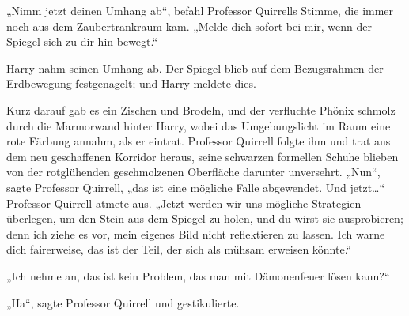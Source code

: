 „Nimm jetzt deinen Umhang ab“, befahl Professor Quirrells Stimme, die immer noch aus dem Zaubertrankraum kam. „Melde dich sofort bei mir, wenn der Spiegel sich zu dir hin bewegt.“

Harry nahm seinen Umhang ab.
Der Spiegel blieb auf dem Bezugsrahmen der Erdbewegung festgenagelt; und Harry meldete dies.

Kurz darauf gab es ein Zischen und Brodeln, und der verfluchte Phönix schmolz durch die Marmorwand hinter Harry, wobei das Umgebungslicht im Raum eine rote Färbung annahm, als er eintrat. Professor Quirrell folgte ihm und trat aus dem neu geschaffenen Korridor heraus, seine schwarzen formellen Schuhe blieben von der rotglühenden geschmolzenen Oberfläche darunter unversehrt.
„Nun“, sagte Professor Quirrell, „das ist eine mögliche Falle abgewendet. Und jetzt…“ Professor Quirrell atmete aus. „Jetzt werden wir uns mögliche Strategien überlegen, um den Stein aus dem Spiegel zu holen, und du wirst sie ausprobieren; denn ich ziehe es vor, mein eigenes Bild nicht reflektieren zu lassen. Ich warne dich fairerweise, das ist der Teil, der sich als mühsam erweisen könnte.“

„Ich nehme an, das ist kein Problem, das man mit Dämonenfeuer lösen kann?“

„Ha“, sagte Professor Quirrell und gestikulierte.

